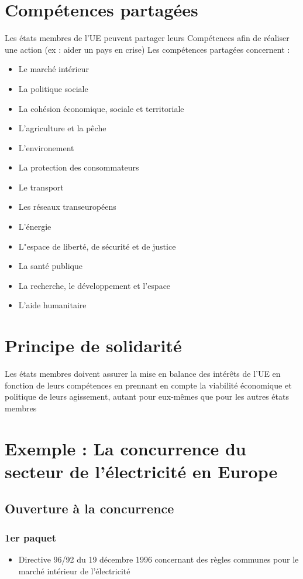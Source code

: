 \section{Compétences partagées}
Les états membres de l'UE peuvent partager leurs Compétences afin de réaliser une action (ex : aider un pays en crise) \newline
Les compétences partagées concernent :
\begin{itemize}
    \item Le marché intérieur
    \item La politique sociale
    \item La cohésion économique, sociale et territoriale
    \item L'agriculture et la pêche
    \item L'environement
    \item La protection des consommateurs
    \item Le transport
    \item Les réseaux transeuropéens
    \item L'énergie
    \item L"espace de liberté, de sécurité et de justice
    \item La santé publique
    \item La recherche, le développement et l'espace
    \item L'aide humanitaire \newline
\end{itemize}
\newpage
\section{Principe de solidarité}
Les états membres doivent assurer la mise en balance des intérêts de l'UE en fonction de leurs compétences en prennant en compte la viabilité économique et politique de leurs agissement, autant pour eux-mêmes que pour les autres états membres
\section{Exemple : La concurrence du secteur de l'électricité en Europe}
\subsection{Ouverture à la concurrence}
\subsubsection{1er paquet}
\begin{itemize}
    \item Directive 96/92 du 19 décembre 1996 concernant des règles communes pour le marché intérieur de l’électricité
\end{itemize}
